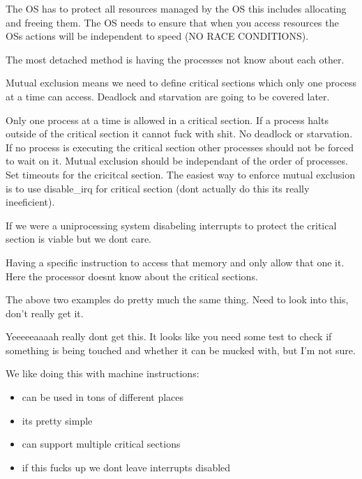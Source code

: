 \documentclass[24pt]{article}
\begin{document}

The OS has to protect all resources managed by the OS this includes allocating and freeing them. The OS needs to ensure that when you access resources the OSs actions will be independent to speed (NO RACE CONDITIONS).

The most detached method is having the processes not know about each other.


Mutual exclusion means we need to define critical sections which only one process at a time can access.  Deadlock and starvation are going to be covered later.

Only one process at a time is allowed in a critical section. If a process halts outside of the critical section it cannot fuck with shit. No deadlock or starvation. If no process is executing the critical section other processes should not be forced to wait on it. Mutual exclusion should be independant of the order of processes. Set timeouts for the cricitcal section. The easiest way to enforce mutual exclusion is to use disable\_irq for critical section (dont actually do this its really ineeficient).

If we were a uniprocessing system disabeling interrupts to protect the critical section is viable but we dont care.

Having a specific instruction to access that memory and only allow that one it. Here the processor doesnt know about the critical sections.


The above two examples do pretty much the same thing. Need to look into this, don't really get it.

Yeeeeeaaaah really dont get this. It looks like you need some test to check if something is being touched and whether it can be mucked with, but I'm not sure.

We like doing this with machine instructions:
\begin{itemize}
    \item can be used in tons of different places
    \item its pretty simple
    \item can support multiple critical sections
    \item if this fucks up we dont leave interrupts disabled
\end{itemize}
\end{document}
